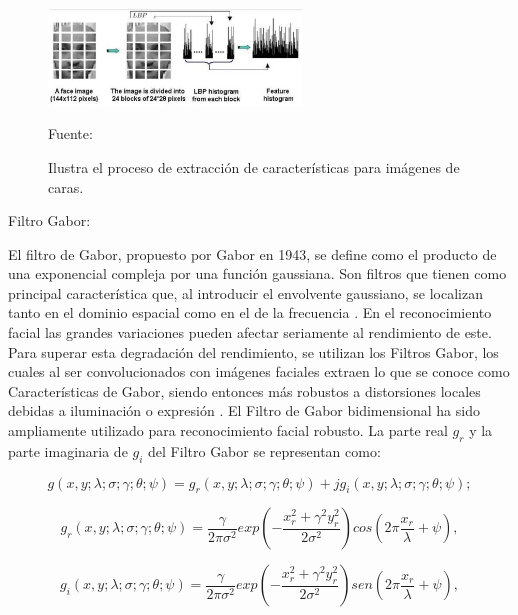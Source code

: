 \begin{enumerate}
\begin{figure}[ht]
\begin{center}
\includegraphics[width=0.6\textwidth]{Imagen23}
\end{center}
\begin{center}
\vskip -0.5cm
\caption{\small{Ilustra el proceso de extracción de características para imágenes de caras.}}
{\small{Fuente: \cite{Aguilar}}}
\end{center}
\end{figure}

{\bf\item Filtro Gabor:} \vskip 0.1cm
El filtro de Gabor, propuesto por Gabor en 1943, se define como el producto de una exponencial compleja por una función gaussiana. Son filtros que tienen como principal característica que, al introducir el envolvente gaussiano, se localizan tanto en el dominio espacial como en el de la frecuencia \citep{Aguilar}. 
\vskip 0.1cm
En el reconocimiento facial las grandes variaciones pueden afectar seriamente al rendimiento de este. Para superar esta degradación del rendimiento, se utilizan los Filtros Gabor, los cuales al ser convolucionados con imágenes faciales extraen lo que se conoce como Características de Gabor, siendo entonces más robustos a distorsiones locales debidas a iluminación o expresión \citep{Adams}.
\vskip 0.1cm
El Filtro de Gabor bidimensional ha sido ampliamente utilizado para reconocimiento facial robusto. La parte real $g_{r}$ y la parte imaginaria de $g_{i}$ del Filtro Gabor se representan como: 

\begin{equation}
g(x, y; \lambda; \sigma; \gamma; \theta; \psi) = g_{r}(x, y; \lambda; \sigma; \gamma; \theta; \psi)+j g_{i}(x, y; \lambda; \sigma; \gamma; \theta; \psi);
\end{equation}

\begin{equation}
g_{r}(x, y; \lambda; \sigma; \gamma; \theta; \psi) = \frac{\gamma}{2\pi\sigma^{2}}exp(-\frac{x_r^2+\gamma^2y_r^2}{2\sigma^2})cos(2\pi\frac{x_{r}}{\lambda}+\psi), 
\end{equation}

\begin{equation}
g_{i}(x, y; \lambda; \sigma; \gamma; \theta; \psi) = \frac{\gamma}{2\pi\sigma^{2}}exp(-\frac{x_r^2+\gamma^2y_r^2}{2\sigma^2})sen(2\pi\frac{x_{r}}{\lambda}+\psi), 
\end{equation}


\end{enumerate}
